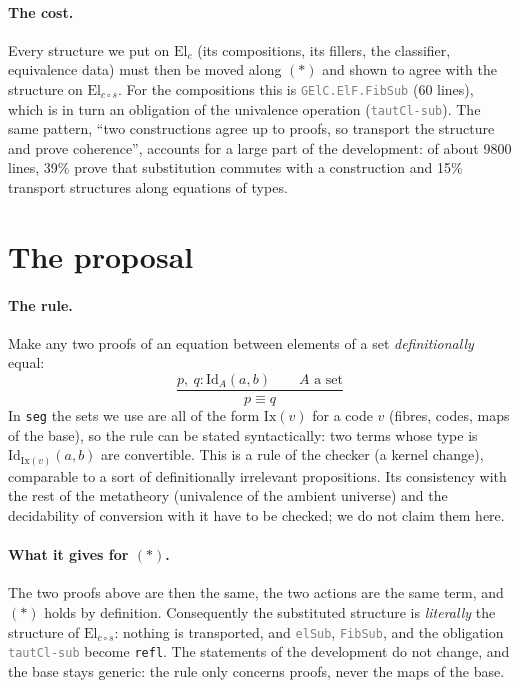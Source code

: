 \documentclass[11pt]{article}
\newcommand{\seg}[1]{\textcolor{gray}{\texttt{\small #1}}}
\newcommand{\El}{\mathrm{El}}
\newcommand{\Id}{\mathrm{Id}}
\theoremstyle{remark}
\begin{document}
\paragraph{The cost.}  Every structure we put on $\El_c$ (its compositions,
its fillers, the classifier, equivalence data) must then be moved along
$(\ast)$ and shown to agree with the structure on $\El_{c\circ s}$.  For the
compositions this is \seg{GElC.ElF.FibSub} (60 lines), which is in turn an
obligation of the univalence operation (\seg{tautCl-sub}).  The same
pattern, ``two constructions agree up to proofs, so transport the structure
and prove coherence'', accounts for a large part of the development: of
about 9800 lines, 39\% prove that substitution commutes with a
construction and 15\% transport structures along equations of types.

\section{The proposal}

\paragraph{The rule.}  Make any two proofs of an equation between elements
of a set \emph{definitionally} equal:
\[ \frac{p,\ q : \Id_A(a, b) \qquad A \text{ a set}}{p \equiv q} \]
In \texttt{seg} the sets we use are all of the form $\mathrm{Ix}(v)$ for a
code $v$ (fibres, codes, maps of the base), so the rule can be stated
syntactically: two terms whose type is $\Id_{\mathrm{Ix}(v)}(a, b)$ are
convertible.  This is a rule of the checker (a kernel change), comparable
to a sort of definitionally irrelevant propositions.  Its consistency with the
rest of the metatheory (univalence of the ambient universe) and the
decidability of conversion with it have to be checked; we do not claim them
here.

\paragraph{What it gives for $(\ast)$.}  The two proofs above are then the
same, the two actions are the same term, and $(\ast)$ holds by definition.
Consequently the substituted structure is \emph{literally} the structure
of $\El_{c\circ s}$: nothing is transported, and \seg{elSub},
\seg{FibSub}, and the obligation \seg{tautCl-sub} become \texttt{refl}.
The statements of the development do not change, and the base stays
generic: the rule only concerns proofs, never the maps of the base.
\end{document}
